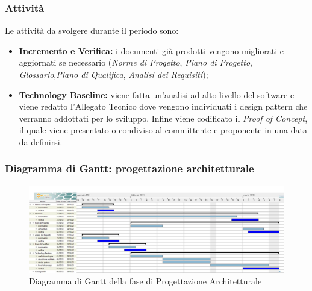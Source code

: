 \subsubsection{Attività}
Le attività da svolgere durante il periodo sono:
\begin{itemize}
	\item \textbf{Incremento e Verifica:} i documenti già prodotti vengono migliorati e aggiornati se necessario (\textit{Norme di Progetto}, \textit{Piano di Progetto}, \textit{Glossario},\textit{Piano di Qualifica}, \textit{Analisi dei Requisiti});
	\item \textbf{Technology Baseline:} viene fatta un'analisi ad alto livello del software e viene redatto l'Allegato Tecnico dove vengono individuati i design pattern che verranno addottati per lo sviluppo. Infine viene codificato il \textit{Proof of Concept}, il quale viene presentato o condiviso al committente e proponente in una data da definirsi.
\end{itemize}
\subsubsection{Diagramma di Gantt: progettazione architetturale}
\begin{figure}[H]
    \centering
    \includegraphics[scale = 0.25]{components/img/progettazione_architetturale.jpg}
    \caption{Diagramma di Gantt della fase di Progettazione Architetturale}
    \label{fig:Diagramma di Gantt, fase di Progettazione Architetturale}
\end{figure}

\newpage
